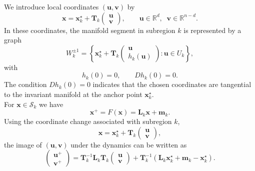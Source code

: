 \documentclass{article}
\theoremstyle{example}
\theoremstyle{plain}
\theoremstyle{definition}
\theoremstyle{remark}
\def\vm{{\bm{m}}}
\def\vx{{\bm{x}}}
\def\mL{{\bm{L}}}
\def\mT{{\bm{T}}}
\begin{document}
We introduce local coordinates $(\bm{u},\bm{v})$ by
\begin{equation}
\vx = \vx_k^\star + \mT_k
\begin{pmatrix}
\bm{u} \\ \bm{v}
\end{pmatrix},
\qquad
\bm{u}\in\mathbb R^d,\;\; \bm{v}\in\mathbb R^{n-d}.
\end{equation}
In these coordinates, the manifold segment in subregion $k$ is represented by a graph
\begin{equation}
W^{\pm1}_k
=
\left\{
\vx_k^\star + \mT_k
\begin{pmatrix}
\bm{u} \\ h_k(\bm{u})
\end{pmatrix}
:
\bm{u}\in U_k
\right\},
\label{eq:pwl-local-graph}
\end{equation}
with
\begin{equation}
h_k(0)=0,
\qquad
Dh_k(0)=0 .
\end{equation}
The condition $Dh_k(0)=0$ indicates that the chosen coordinates are tangential to the invariant manifold at the anchor point $\vx_k^\star$.\\[2ex]
%
For $\vx\in\mathcal S_k$ we have
\begin{equation}
\vx^+ = F(\vx)=\mL_k \vx + \vm_k .
\end{equation}
Using the coordinate change associated with subregion $k$, 
\begin{equation}
\vx = \vx_k^\star + \mT_k
\begin{pmatrix}
\bm{u}\\ \bm{v}
\end{pmatrix},
\end{equation}
the image of $(\bm{u},\bm{v})$ under the dynamics can be written as
\begin{equation}
\begin{pmatrix}
\bm{u}^+ \\ \bm{v}^+
\end{pmatrix}
=
\mT_k^{-1} \mL_k \mT_k
\begin{pmatrix}
\bm{u} \\ \bm{v}
\end{pmatrix}
+
\mT_k^{-1}(\mL_k \vx_k^\star + \vm_k - \vx_k^\star).
\label{eq:pwl-uv-map}
\end{equation}
\end{document}
